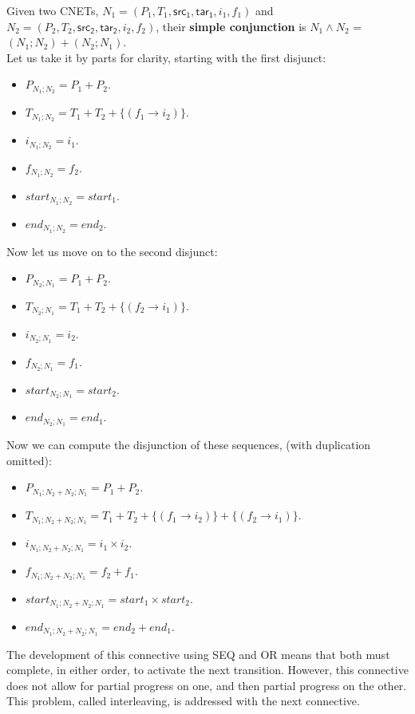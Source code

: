 \begin{definition}
  \label{def:STEP-AND-PN}
  Given two CNETs, $N_1= (P_1, T_1, \mathsf{src_1}, \mathsf{tar_1}, i_1, f_1)$ and $N_2= (P_2, T_2, \mathsf{src_2}, \mathsf{tar_2}, i_2, f_2)$, their \textbf{simple conjunction} is $N_1 \wedge N_2$ = $(N_1 ; N_2) + (N_2 ; N_1)$. \\
Let us take it by parts for clarity, starting with the first disjunct:
\begin{itemize}
 \item $P_{N_1;N_2} = P_1 + P_2.$
 \item $T_{N_1;N_2} = T_1 + T_2 + \{(f_1 \to i_2)\}$.
 \item $i_{N_1;N_2} = i_1$.
 \item $f_{N_1;N_2} = f_2$.
 \item $start_{N_1;N_2} = start_1.$
 \item $end_{N_1;N_2} = end_2. $
\end{itemize} 
Now let us move on to the second disjunct:
\begin{itemize}
 \item $P_{N_2;N_1} = P_1 + P_2.$
 \item $T_{N_2;N_1} = T_1 + T_2 + \{(f_2 \to i_1)\}$.
 \item $i_{N_2;N_1} = i_2$.
 \item $f_{N_2;N_1} = f_1$.
 \item $start_{N_2;N_1} = start_2.$
 \item $end_{N_2;N_1} = end_1. $
\end{itemize} 
Now we can compute the disjunction of these sequences, (with duplication omitted):
\begin{itemize}
 \item $P_{N_1;N_2 + N_2;N_1} = P_1 + P_2.$
 \item $T_{N_1;N_2 + N_2;N_1} = T_1 + T_2 + \{(f_1 \to i_2)\} + \{(f_2 \to i_1)\}$.
 \item $i_{N_1;N_2 + N_2;N_1} = i_1 \times i_2$.
 \item $f_{N_1;N_2 + N_2;N_1} = f_2 + f_1$.
 \item $start_{N_1;N_2 + N_2;N_1} = start_1 \times start_2.$
 \item $end_{N_1;N_2 + N_2;N_1} = end_2 + end_1. $
\end{itemize} 
The development of this connective using SEQ and OR means that both must complete, in either order, to activate the next transition. However, this connective does not allow for partial progress on one, and then partial progress on the other. This problem, called interleaving, is addressed with the next connective.
\end{definition}

